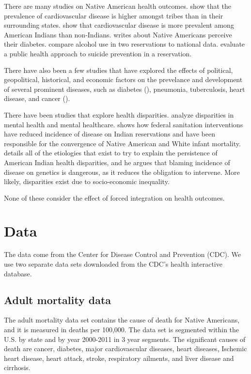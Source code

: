 \documentclass[12pt]{article}
\begin{document}
There are many studies on Native American health outcomes. 
\cite{levin2002geographic} show that the prevalence of cardiovascular disease is higher amongst tribes than in their surrounding states.
\cite{harwell2001cardiovascular} show that cardiovascular disease is more prevalent among American Indians than non-Indians.
\cite{patel2013health} writes about Native Americans perceive their diabetes.
\cite{beals2003racial} compare alcohol use in two reservations to national data.
\cite{may2005outcome} evaluate a public health approach to suicide prevention in a reservation.

There have also been a few studies that have explored the effects of political, geopolitical, historical, and economic factors on the prevelance and development of several prominent diseases, such as diabetes (\cite{patchell2014role}), pneumonia, tuberculosis, heart disease, and cancer (\cite{heiner2014demographic}).

There have been studies that explore health disparities.
\cite{mcguire2008new} analyze disparities in mental health and mental healthcare.
\cite{watson2006public} shows how federal sanitation interventions have reduced incidence of disease on Indian reservations and have been responsible for the convergence of Native American and White infant mortality.
\cite{jones2006persistence} details all of the etiologies that exist to try to explain the persistence of American Indian health disparities, and he argues that blaming incidence of disease on genetics is dangerous, as it reduces the obligation to intervene. More likely, disparities exist due to socio-economic inequality.

None of these consider the effect of forced integration on health outcomes.

\section{Data}
The data come from the Center for Disease Control and Prevention (CDC). We use two separate data sets downloaded from the CDC's health interactive database.

\subsection{Adult mortality data}
The adult mortality data set contains the cause of death for Native Americans, and it is measured in deaths per 100,000.
The data set is segmented within the U.S. by state and by year 2000-2011 in 3 year segments.
The significant causes of death are cancer, diabetes, major cardiovascular diseases, heart diseases, Ischemic heart disease, heart attack, stroke, respiratory ailments, and liver disease and cirrhosis.
\end{document}
